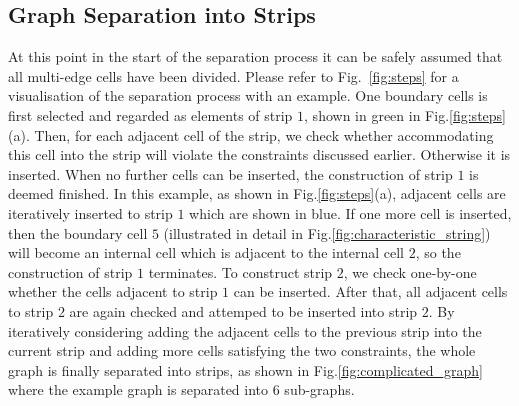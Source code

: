 \documentclass[conference]{IEEEtran}
\begin{document}
\subsection{Graph Separation into Strips}
At this point in the start of the separation process it can be safely assumed that all multi-edge cells have been divided. %
Please refer to Fig.~\ref{fig:steps} for a visualisation of the separation process with an example. One boundary cells is first selected and regarded as elements of strip $1$, shown in green in Fig.\ref{fig:steps}(a).
Then, for each adjacent cell of the strip, we check whether accommodating this cell into the strip will violate the constraints discussed earlier. 
Otherwise it is inserted. 
When no further cells can be inserted, the construction of strip $1$ is deemed finished. 
In this example, as shown in Fig.\ref{fig:steps}(a), adjacent cells are iteratively inserted to strip $1$ which are shown in blue. If one more cell is inserted, then the boundary cell $5$ (illustrated in detail in Fig.\ref{fig:characteristic_string}) will become an internal cell which is adjacent to the internal cell $2$, so the construction of strip $1$ terminates.  
To construct strip $2$, we check one-by-one whether the cells adjacent to strip $1$ can be inserted. 
After that, all adjacent cells to strip $2$  are again checked and attemped to be inserted into strip $2$. 
By iteratively considering adding the adjacent cells to the previous strip into the current strip and adding more cells satisfying the two constraints, 
the whole graph is finally separated into strips, as shown in Fig.\ref{fig:complicated_graph} where the example graph is separated into $6$ sub-graphs. 
\end{document}
